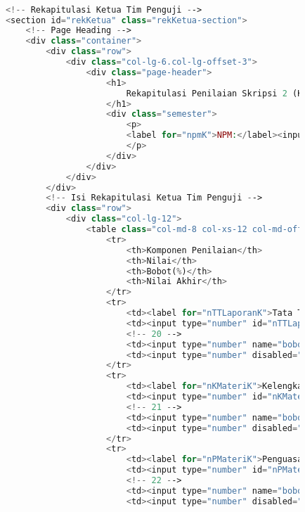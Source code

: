 \begin{lstlisting}[language=PHP,basicstyle=\tiny,caption=skripsi.php]
			
			
			
			<!-- Rekapitulasi Ketua Tim Penguji -->
			<section id="rekKetua" class="rekKetua-section">
				<!-- Page Heading -->
				<div class="container">
					<div class="row">
						<div class="col-lg-6.col-lg-offset-3">
							<div class="page-header">
								<h1>
									Rekapitulasi Penilaian Skripsi 2 (Ketua Tim Penguji)
								</h1>
								<div class="semester">
									<p> 
									<label for="npmK">NPM:</label><input id="nmpK" maxlength="10" value="{{ n_npm}}" disabled="disabled" />
									</p>
								</div>
							</div>
						</div>
					</div>
					<!-- Isi Rekapitulasi Ketua Tim Penguji -->
					<div class="row">
						<div class="col-lg-12">
							<table class="col-md-8 col-xs-12 col-md-offset-4 col-md-pull-2 table-responsive">
								<tr>
									<th>Komponen Penilaian</th>
									<th>Nilai</th>
									<th>Bobot(%)</th> 
									<th>Nilai Akhir</th>
								</tr>
								<tr>
									<td><label for="nTTLaporanK">Tata Tulis Laporan</label></td>
									<td><input type="number" id="nTTLaporanK" max="100" ng-model="nilai_TTLaporanK" class="form-nilai"/></td>
									<!-- 20 -->
									<td><input type="number" name="bobotTataTulisLaporanKetua" ng-model="TTLaporanK.value" ng-init="TTLaporanK.value = 15" min="0" max="100" class="form-nilai" readonly="readonly" /></td>
									<td><input type="number" disabled="disabled" value="{{nilai_TTLaporanK * TTLaporanK.value / 100}}" ng-model="total_TTLaporanK" class="form-nilai"/></td>
								</tr>
								<tr>
									<td><label for="nKMateriK">Kelengkapan Materi</label></td>
									<td><input type="number" id="nKMateriK" max="100" ng-model="nilai_KMateriK" class="form-nilai"/></td>
									<!-- 21 -->
									<td><input type="number" name="bobotKelengkapanMateriKetua" ng-model="KMateriK.value" ng-init="KMateriK.value = 10" min="0" max="100" class="form-nilai" readonly="readonly" /></td>
									<td><input type="number" disabled="disabled" value="{{nilai_KMateriK * KMateriK.value / 100}}" ng-model="total_KMateriK" class="form-nilai"/></td>
								</tr>
								<tr>
									<td><label for="nPMateriK">Penguasaan Materi</label></td>
									<td><input type="number" id="nPMateriK" max="100" ng-model="nilai_PMateriK" class="form-nilai"/></td>
									<!-- 22 -->
									<td><input type="number" name="bobotPenguasaanMateriKetua" ng-model="PMateriK.value" ng-init="PMateriK.value = 30" min="0" max="100" class="form-nilai" readonly="readonly" /></td>
									<td><input type="number" disabled="disabled" value="{{nilai_PMateriK * PMateriK.value / 100}}" ng-model="total_PMateriA" class="form-nilai"/></td>

\end{lstlisting}
